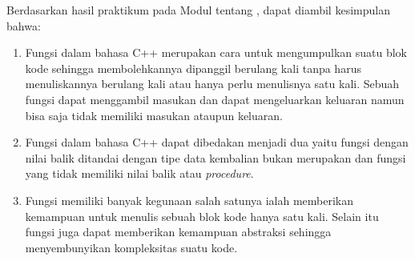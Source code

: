 \documentclass{subfiles}
\begin{document}
    \ilz{}Berdasarkan hasil praktikum pada Modul {\thechapter} tentang {\leftmark}, dapat diambil kesimpulan bahwa:
    \begin{enumerate}
        \item {Fungsi dalam bahasa C++ merupakan cara untuk mengumpulkan suatu blok kode sehingga membolehkannya dipanggil berulang kali tanpa harus menuliskannya berulang kali atau hanya perlu menulisnya satu kali. Sebuah fungsi dapat menggambil masukan dan dapat mengeluarkan keluaran namun bisa saja tidak memiliki masukan ataupun keluaran.}
        \item {Fungsi dalam bahasa C++ dapat dibedakan menjadi dua yaitu fungsi dengan nilai balik ditandai dengan tipe data kembalian bukan merupakan  dan fungsi yang tidak memiliki nilai balik atau \textit{procedure}.}
        \item {Fungsi memiliki banyak kegunaan salah satunya ialah memberikan kemampuan untuk menulis sebuah blok kode hanya satu kali. Selain itu fungsi juga dapat memberikan kemampuan abstraksi sehingga menyembunyikan kompleksitas suatu kode.}
    \end{enumerate}
\end{document}
